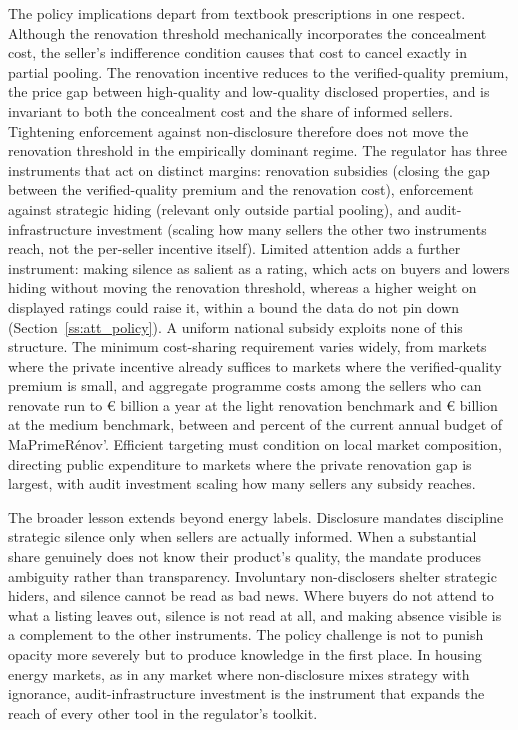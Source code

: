 \documentclass[10pt,letterpaper]{bp-template-concise}
\begin{document}
The policy implications depart from textbook prescriptions in one respect. Although the renovation threshold mechanically incorporates the concealment cost, the seller's indifference condition causes that cost to cancel exactly in partial pooling. The renovation incentive reduces to the verified-quality premium, the price gap between high-quality and low-quality disclosed properties, and is invariant to both the concealment cost and the share of informed sellers. Tightening enforcement against non-disclosure therefore does not move the renovation threshold in the empirically dominant regime. The regulator has three instruments that act on distinct margins: renovation subsidies (closing the gap between the verified-quality premium and the renovation cost), enforcement against strategic hiding (relevant only outside partial pooling), and audit-infrastructure investment (scaling how many sellers the other two instruments reach, not the per-seller incentive itself). Limited attention adds a further instrument: making silence as salient as a rating, which acts on buyers and lowers hiding without moving the renovation threshold, whereas a higher weight on displayed ratings could raise it, within a bound the data do not pin down (Section~\ref{ss:att_policy}). %
 A uniform national subsidy exploits none of this structure. The minimum cost-sharing requirement varies widely, from markets where the private incentive already suffices to markets where the verified-quality premium is small, and aggregate programme costs among the sellers who can renovate run to \euro{}\attScCostBaseTotTwoFifty{} billion a year at the light renovation benchmark and \euro{}\attScCostBaseTotFiveHundred{} billion at the medium benchmark, between \attScCostBaseTotTwoFiftyLo{} and \attScCostBaseTotFiveHundredHi{} percent of the current annual budget of MaPrimeR\'enov'. Efficient targeting must condition on local market composition, directing public expenditure to markets where the private renovation gap is largest, with audit investment scaling how many sellers any subsidy reaches.

The broader lesson extends beyond energy labels. Disclosure mandates discipline strategic silence only when sellers are actually informed. When a substantial share genuinely does not know their product's quality, the mandate produces ambiguity rather than transparency. Involuntary non-disclosers shelter strategic hiders, and silence cannot be read as bad news. Where buyers do not attend to what a listing leaves out, silence is not read at all, and making absence visible is a complement to the other instruments. %
 The policy challenge is not to punish opacity more severely but to produce knowledge in the first place. In housing energy markets, as in any market where non-disclosure mixes strategy with ignorance, audit-infrastructure investment is the instrument that expands the reach of every other tool in the regulator's toolkit.
\end{document}
